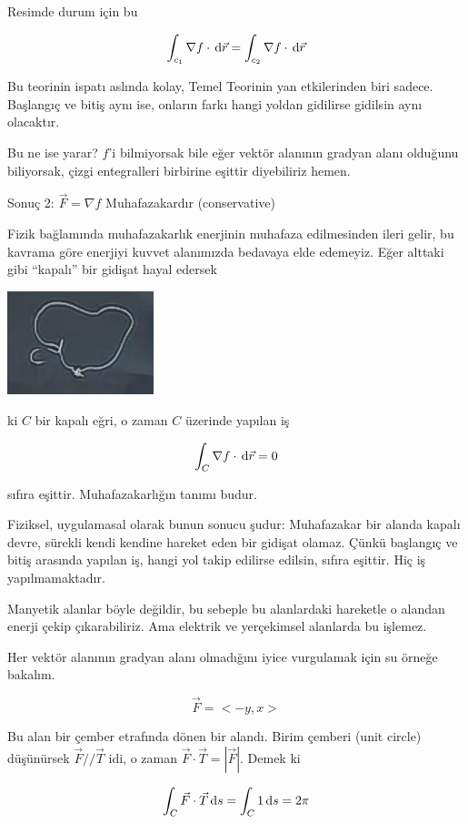 \documentclass[12pt,fleqn]{article}\usepackage{../../common}
\begin{document}
Resimde durum için bu

$$ \int_{c_1}\nabla f \cdot \,\mathrm{d}\vec{r} =  \int_{c_2}\nabla f \cdot \,\mathrm{d}\vec{r} $$

Bu teorinin ispatı aslında kolay, Temel Teorinin yan etkilerinden biri
sadece. Başlangıç ve bitiş aynı ise, onların farkı hangi yoldan gidilirse
gidilsin aynı olacaktır.

Bu ne ise yarar? $f$'i bilmiyorsak bile eğer vektör alanının gradyan alanı
olduğunu biliyorsak, çizgi entegralleri birbirine eşittir diyebiliriz hemen. 

Sonuç 2: $\vec{F} = \nabla f$ Muhafazakardır (conservative)

Fizik bağlamında muhafazakarlık enerjinin muhafaza edilmesinden ileri
gelir, bu kavrama göre enerjiyi kuvvet alanımızda bedavaya elde
edemeyiz. Eğer alttaki gibi ``kapalı'' bir gidişat hayal edersek

\includegraphics[height=3cm]{20_8.png}

ki $C$ bir kapalı eğri, o zaman $C$ üzerinde yapılan iş

$$ \int_{C}\nabla f \cdot \,\mathrm{d}\vec{r} = 0$$

sıfıra eşittir. Muhafazakarlığın tanımı budur. 

Fiziksel, uygulamasal olarak bunun sonucu şudur: Muhafazakar bir alanda
kapalı devre, sürekli kendi kendine hareket eden bir gidişat olamaz. Çünkü
başlangıç ve bitiş arasında yapılan iş, hangi yol takip edilirse edilsin,
sıfıra eşittir. Hiç iş yapılmamaktadır. 

Manyetik alanlar böyle değildir, bu sebeple bu alanlardaki hareketle o alandan
enerji çekip çıkarabiliriz. Ama elektrik ve yerçekimsel alanlarda bu işlemez.

Her vektör alanının gradyan alanı olmadığını iyice vurgulamak için su
örneğe bakalım. 

$$ \vec{F} = <-y,x> $$

Bu alan bir çember etrafında dönen bir alandı. Birim çemberi (unit circle)
düşünürsek $\vec{F} // \vec{T}$ idi, o zaman $\vec{F}\cdot\vec{T} =
|\vec{F}|$. Demek ki

$$ \int_C \vec{F}\cdot\vec{T} \,\mathrm{d} s = \int_C 1 \,\mathrm{d} s = 2\pi $$
\end{document}
